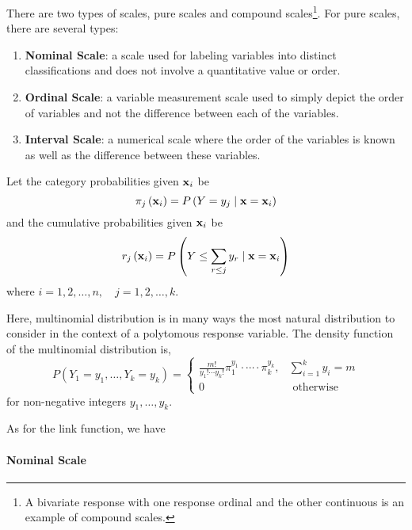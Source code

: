 \begin{remark}
	There are two types of scales, pure scales and compound scales\footnote{A bivariate response with one response ordinal and the other continuous is an example of compound scales.}. For pure scales, there are several types:
	\begin{enumerate}
		\item \textbf{Nominal Scale}: a scale used for labeling variables into distinct classifications and does not involve a quantitative value or order.
		\item \textbf{Ordinal Scale}: a variable measurement scale used to simply depict the order of variables and not the difference between each of the variables.
		\item \textbf{Interval Scale}: a numerical scale where the order of the variables is known as well as the difference between these variables.
	\end{enumerate}
\end{remark}

Let the category probabilities given ${\bf x}_{i}$ be
\begin{equation}
	\pi_{j}\left({\bf x}_{i}\right)=P\left(Y=y_{j}\mid{\bf x}={\bf x}_{i}\right)
\end{equation}
and the cumulative probabilities given ${\bf x}_{i}$ be
\begin{equation}
	r_{j}\left({\bf x}_{i}\right)=P\left(Y\leq\sum_{r\leq j}y_{r}\mid{\bf x}={\bf x}_{i}\right)
\end{equation}
where $i=1,2,\ldots,n,\quad j=1,2,\ldots,k$.

Here, multinomial distribution is in many ways the most natural distribution to consider in the context of a polytomous response variable. The density function of the multinomial distribution is,
\begin{equation*}
	P\left(Y_{1}=y_{1},\ldots,Y_{k}=y_{k}\right)=
	\left\{\begin{array}{ll}
		\frac{m!}{y_{1}!\cdots y_{k}!}\pi_{1}^{y_{1}}\cdot\cdots\cdot \pi_{k}^{y_{k}}, & \sum_{i=1}^{k}y_{i}=m \\
		0                                                                              & \text { otherwise }
	\end{array}\right.
\end{equation*}
for non-negative integers $y_{1},\ldots,y_{k}$.

As for the link function, we have

\paragraph*{Nominal Scale}

